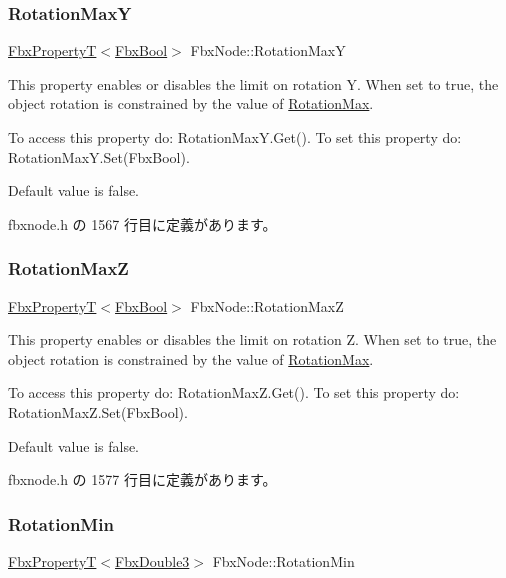 \subsubsection{\texorpdfstring{Rotation\+MaxY}{RotationMaxY}}
{\footnotesize\ttfamily \hyperlink{class_fbx_property_t}{Fbx\+PropertyT}$<$\hyperlink{fbxtypes_8h_a92e0562b2fe33e76a242f498b362262e}{Fbx\+Bool}$>$ Fbx\+Node\+::\+Rotation\+MaxY}

This property enables or disables the limit on rotation Y. When set to {\ttfamily true}, the object rotation is constrained by the value of \hyperlink{class_fbx_node_a04c8e5651641fbfafaa2adb18be50696}{Rotation\+Max}.

To access this property do\+: Rotation\+Max\+Y.\+Get(). To set this property do\+: Rotation\+Max\+Y.\+Set(\+Fbx\+Bool).

Default value is false. 

 fbxnode.\+h の 1567 行目に定義があります。

\mbox{\label{class_fbx_node_a6d1242899fb510f5d5df4f3a1a7cf32c}} 
\subsubsection{\texorpdfstring{Rotation\+MaxZ}{RotationMaxZ}}
{\footnotesize\ttfamily \hyperlink{class_fbx_property_t}{Fbx\+PropertyT}$<$\hyperlink{fbxtypes_8h_a92e0562b2fe33e76a242f498b362262e}{Fbx\+Bool}$>$ Fbx\+Node\+::\+Rotation\+MaxZ}

This property enables or disables the limit on rotation Z. When set to {\ttfamily true}, the object rotation is constrained by the value of \hyperlink{class_fbx_node_a04c8e5651641fbfafaa2adb18be50696}{Rotation\+Max}.

To access this property do\+: Rotation\+Max\+Z.\+Get(). To set this property do\+: Rotation\+Max\+Z.\+Set(\+Fbx\+Bool).

Default value is false. 

 fbxnode.\+h の 1577 行目に定義があります。

\mbox{\label{class_fbx_node_a186dc96c347a68ff32eb1641f02c70c8}} 
\subsubsection{\texorpdfstring{Rotation\+Min}{RotationMin}}
{\footnotesize\ttfamily \hyperlink{class_fbx_property_t}{Fbx\+PropertyT}$<$\hyperlink{fbxtypes_8h_ae0a96f14cde566774c7553aa7523b7a7}{Fbx\+Double3}$>$ Fbx\+Node\+::\+Rotation\+Min}

